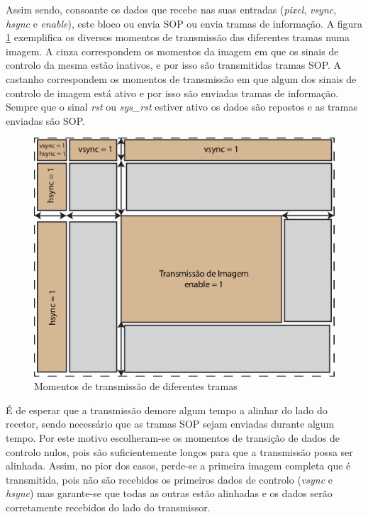 \documentclass[11pt,a4paper]{article}
\begin{document}
	Assim sendo, consoante os dados que recebe nas suas entradas (\textit{pixel}, \textit{vsync}, \textit{hsync} e \textit{enable}), este bloco ou envia SOP ou envia tramas de informação. A figura \ref{fig:momentos_tramas} exemplifica os diversos momentos de transmissão das diferentes tramas numa imagem. A cinza correspondem os momentos da imagem em que os sinais de controlo da mesma estão inativos, e por isso são transmitidas tramas SOP. A castanho correspondem os momentos de transmissão em que algum dos sinais de controlo de imagem está ativo e por isso são enviadas tramas de informação. Sempre que o sinal \textit{rst} ou \textit{sys\_rst} estiver ativo os dados são repostos e as tramas enviadas são SOP. 
	
	\begin{figure}[h!]
		\begin{center}
			\leavevmode
			\includegraphics[width=1.0\textwidth]{exemplo_tramas_transmissoes}
			\caption[Momentos de transmissão de diferentes tramas]{Momentos de transmissão de diferentes tramas}
			\label{fig:momentos_tramas}
		\end{center}
	\end{figure}
	
	É de esperar que a transmissão demore algum tempo a alinhar do lado do recetor, sendo necessário que as tramas SOP sejam enviadas durante algum tempo. Por este motivo escolheram-se os momentos de transição de dados de controlo nulos, pois são suficientemente longos para que a transmissão possa ser alinhada. Assim, no pior dos casos, perde-se a primeira imagem completa que é transmitida, pois não são recebidos os primeiros dados de controlo (\textit{vsync} e \textit{hsync}) mas garante-se que todas as outras estão alinhadas e os dados serão corretamente recebidos do lado do transmissor.
	
\end{document}
